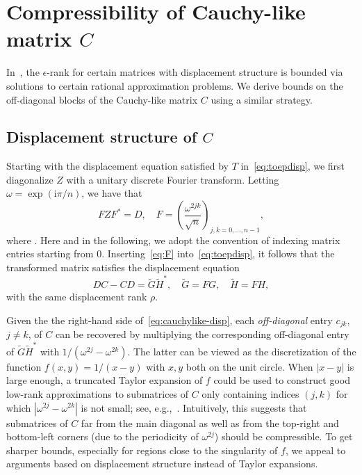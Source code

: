 \documentclass[final,reqno,onefignum,onetabnum]{siamart190516}
\newcommand{\iu}{\mathrm{i}}
\begin{document}
\section{Compressibility of Cauchy-like matrix $C$}
\label{sec:lowrankprop}

In~\cite{Beckermann2019}, the $\epsilon$-rank for certain matrices with displacement structure is bounded via solutions to certain rational approximation problems. We derive bounds on the off-diagonal blocks of the Cauchy-like matrix $C$ using a similar strategy. 
 
 \subsection{Displacement structure of $C$} 
 
 \label{sec:displacement}

 Starting with the displacement equation satisfied by $T$ in~\eqref{eq:toepdisp}, we first diagonalize $Z$ with a unitary discrete Fourier transform. Letting $\omega = \exp ( \iu \pi/n)$, we have that 
\begin{equation} 
\label{eq:F}
 FZF^* = D, \quad F = \left( \frac{\omega^{2jk}}{\sqrt{n}}\right)_{j, k = 0, \ldots, n-1}, 
\end{equation} 
where . Here and in the following, we adopt the convention of indexing matrix entries starting from 0. Inserting~\eqref{eq:F} into~\eqref{eq:toepdisp}, it follows that the transformed matrix  satisfies the displacement equation 
\begin{equation} 
\label{eq:cauchylike-disp}
D C - C D = \widetilde{G}\widetilde{H}^*, \quad \widetilde{G} = FG , \quad \widetilde{H} = F H ,
\end{equation}
with the same displacement rank $\rho$.

Given the the right-hand side of~\eqref{eq:cauchylike-disp}, each \emph{off-diagonal} entry $c_{jk}$, $j\not = k$, of $C$ can be recovered by multiplying the corresponding off-diagonal entry of $\widetilde{G}\widetilde{H}^*$ with
$1/(\omega^{2j} - \omega^{2k})$. The latter can be viewed as the discretization of the function $f(x,y) = 1/(x-y)$ with $x,y$ both on the unit circle. When $|x-y|$ is large enough, a truncated Taylor expansion of $f$ could be used to construct good low-rank approximations to
submatrices of $C$ only containing indices $(j,k)$ for which $|\omega^{2j} - \omega^{2k}|$ is not small; see, e.g.,~\cite{Boerm2010}.
Intuitively, this suggests that submatrices of $C$ far from the main diagonal as well as from the top-right and bottom-left corners (due to the periodicity of $\omega^{2j}$) should be compressible.  To get sharper bounds, especially for regions close to the singularity of $f$, we appeal to arguments based on displacement structure instead of Taylor expansions. 
\end{document}

